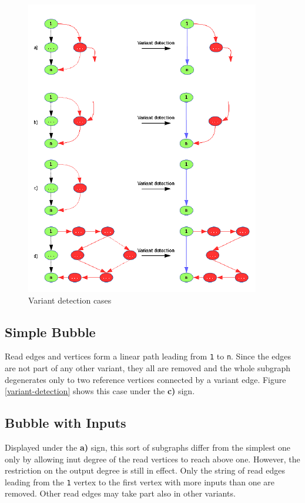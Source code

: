 \begin{figure}[h]
	\centering
	\includegraphics{img/variant-detection.pdf}
	\caption{Variant detection cases}
	\label{fig:variant-detection}
\end{figure}

\subsection{Simple Bubble}
\label{subsec:simple-bubble}

Read edges and vertices form a linear path leading from \texttt{1} to \texttt{n}. Since the edges are not part of any other variant, they all are removed and the whole subgraph degenerates only to two reference vertices connected by a variant edge. Figure \ref{variant-detection} shows this case under the \textbf{c)} sign.

\subsection{Bubble with Inputs}
\label{subsec:bubble-with-inputs}

Displayed under the \textbf{a)} sign, this sort of subgraphs differ from the simplest one only by allowing inut degree of the read vertices to reach above one. However, the restriction on the output degree is still in effect. Only the string of read edges leading from the \texttt{1} vertex to the first vertex with more inputs than one are removed. Other read edges may take part also in other variants.

